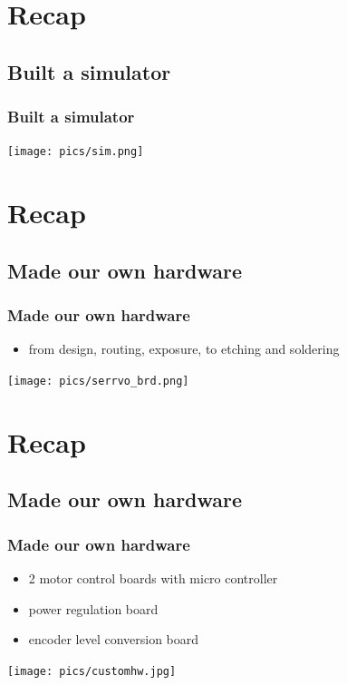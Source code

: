 \documentclass[pdf]{beamer}
\begin{document}
\section{Recap}
\subsection{Built a simulator}
\begin{frame}
\frametitle{Built a simulator}
  \begin{center}
  \texttt{[image: pics/sim.png]}
  \end{center}
\end{frame}

\section{Recap}
\subsection{Made our own hardware}
\begin{frame}
\frametitle{Made our own hardware}
\begin{itemize}
  \item from design, routing, exposure, to etching and soldering
\end{itemize}
  \begin{center}
  \texttt{[image: pics/serrvo\_brd.png]}
  \end{center}
\end{frame}


\section{Recap}
\subsection{Made our own hardware}
\begin{frame}
\frametitle{Made our own hardware}
\begin{itemize}
  \item 2 motor control boards with micro controller
  \item power regulation board 
  \item encoder level conversion board
\end{itemize}
  \begin{center}
  \texttt{[image: pics/customhw.jpg]}
  \end{center}
\end{frame}
\end{document}
